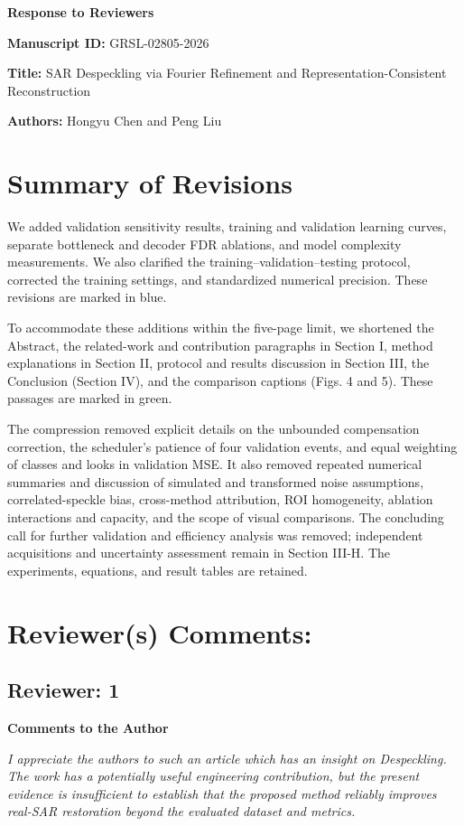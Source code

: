 \documentclass[11pt,letterpaper]{article}
\begin{document}
{\Large\bfseries Response to Reviewers}\par
\textbf{Manuscript ID:} GRSL-02805-2026\par
\textbf{Title:} SAR Despeckling via Fourier Refinement and Representation-Consistent Reconstruction\par
\textbf{Authors:} Hongyu Chen and Peng Liu

\section*{Summary of Revisions}
We added validation sensitivity results, training and validation learning curves, separate bottleneck and decoder FDR ablations, and model complexity measurements. We also clarified the training--validation--testing protocol, corrected the training settings, and standardized numerical precision. These revisions are marked in blue.

To accommodate these additions within the five-page limit, we shortened the Abstract, the related-work and contribution paragraphs in Section I, method explanations in Section II, protocol and results discussion in Section III, the Conclusion (Section IV), and the comparison captions (Figs. 4 and 5). These passages are marked in green.

The compression removed explicit details on the unbounded compensation correction, the scheduler's patience of four validation events, and equal weighting of classes and looks in validation MSE. It also removed repeated numerical summaries and discussion of simulated and transformed noise assumptions, correlated-speckle bias, cross-method attribution, ROI homogeneity, ablation interactions and capacity, and the scope of visual comparisons. The concluding call for further validation and efficiency analysis was removed; independent acquisitions and uncertainty assessment remain in Section III-H. The experiments, equations, and result tables are retained.

\section*{Reviewer(s) Comments:}
\subsection*{Reviewer: 1}
\textbf{Comments to the Author}

\textit{I appreciate the authors to such an article which has an insight on Despeckling. The work has a potentially useful engineering contribution, but the present evidence is insufficient to establish that the proposed method reliably improves real-SAR restoration beyond the evaluated dataset and metrics.}
\end{document}
